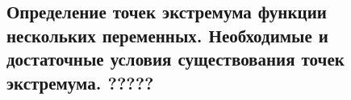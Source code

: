 {
\subsection{Определение точек экстремума функции нескольких переменных. Необходимые и достаточные условия существования точек экстремума. ?????}
}